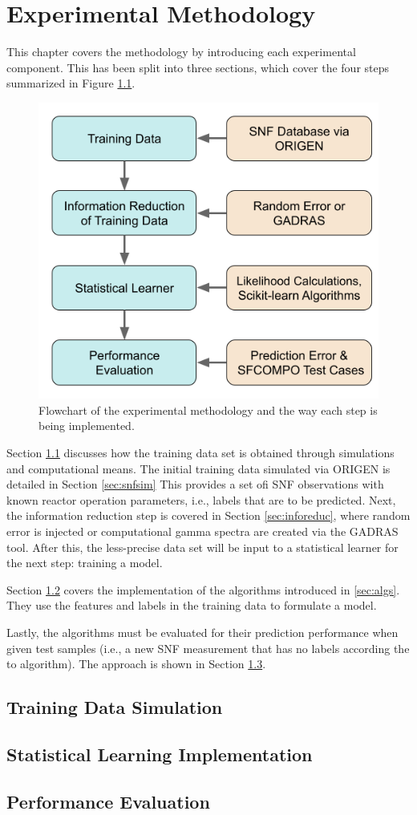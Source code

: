 \chapter{Experimental Methodology}
\label{ch:method}

This chapter covers the methodology by introducing each experimental component.
This has been split into three sections, which cover the four steps summarized
in Figure \ref{fig:method}.

\begin{figure}[!ht]
  \centering
  \includegraphics[width=0.7\linewidth]{./chapters/method/methodology.png}
  \caption{Flowchart of the experimental methodology and the way each step is being implemented.}
  \label{fig:method}
\end{figure}

Section \ref{sec:training} discusses how the training data set is obtained
through simulations and computational means. The initial training data
simulated via \gls{ORIGEN} is detailed in Section \ref{sec:snfsim} This
provides a set ofi \gls{SNF} observations with known reactor operation
parameters, i.e., labels that are to be predicted.  Next, the information
reduction step is covered in Section \ref{sec:inforeduc}, where random error is
injected or computational gamma spectra are created via the \gls{GADRAS} tool.
After this, the less-precise data set will be input to a statistical learner
for the next step: training a model.

Section \ref{sec:statmodel} covers the implementation of the algorithms
introduced in \ref{sec:algs}. They use the features and labels in the training
data to formulate a model.  

Lastly, the algorithms must be evaluated for their prediction performance when
given test samples (i.e., a new \gls{SNF} measurement that has no labels
according the to algorithm).  The approach is shown in Section \ref{sec:eval}. 

\section{Training Data Simulation}
\label{sec:training}


\section{Statistical Learning Implementation}
\label{sec:statmodel}


\section{Performance Evaluation}
\label{sec:eval}

